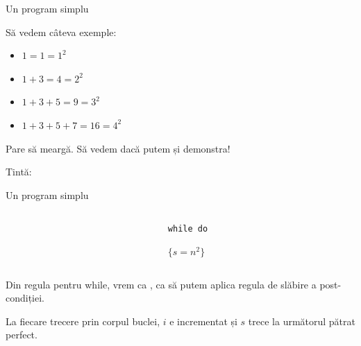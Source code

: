 \begin{frame}{Un program simplu}
\begin{example}[cont.]
Să vedem câteva exemple:
\begin{itemize}
	\item $1 = 1 = 1^2$
	\item $1 + 3 = 4 = 2^2$
	\item $1 + 3 + 5 = 9 = 3^2$
	\item $1 + 3 + 5 + 7 = 16 = 4^2$
\end{itemize}

Pare să meargă. Să vedem dacă putem și demonstra!

\medskip
Tintă: 
\end{example}
\end{frame}

\begin{frame}{Un program simplu}
\begin{example}[cont.]

\medskip
\begin{columns}
\begin{column}{0.4\textwidth}
\end{column}
\begin{column}{0.4\textwidth}
\texttt{while  do}

\hspace{.3cm} 

\hspace{.3cm} 

$\{s = n^2\}$
\end{column}
\end{columns}

\medskip
Din regula pentru while, vrem ca , ca să putem aplica regula de slăbire a post-condiției.

La fiecare trecere prin corpul buclei, $i$ e incrementat și $s$ trece la următorul pătrat perfect.

\pause
{}
\end{example}
\end{frame}


